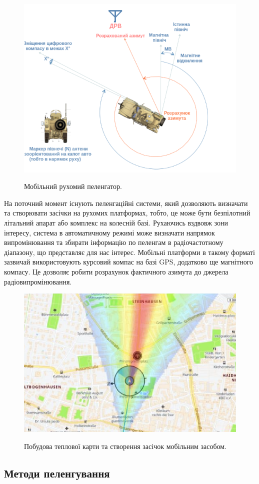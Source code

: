 \documentclass{article}
\begin{document}
\begin{figure}[H]
	\centering
	{\includegraphics[width=0.6\linewidth]{images/mobile_df.png}}
	\caption{\label{fig:triangulations} Мобільний рухомий пеленгатор.}
\end{figure}


На поточний момент існують пеленгаційні системи, який дозволяють визначати та створювати засічки на рухомих платформах, тобто, це може бути безпілотний літальний апарат або комплекс на колесній базі.
Рухаючись вздвовж зони інтересу, система в автоматичному режимі може визначати напрямок випромінювання та збирати інформацію по пеленгам в радіочастотному діапазону, що представляє для нас інтерес. Мобільні платформи в такому форматі зазвичай використовують курсовий компас на базі GPS, додатково ще магнітного компасу. Це дозволяє робити розрахунок фактичного азимута до джерела радіовипромінювання. 

\begin{figure}[H]
	\centering
	{\includegraphics[width=0.6\linewidth]{images/heatmap-df.png}}
	\caption{\label{fig:triangulations} Побудова теплової карти та створення засічок мобільним засобом.}
\end{figure}
 


\subsection{Методи пеленгування}
 
\end{document}

